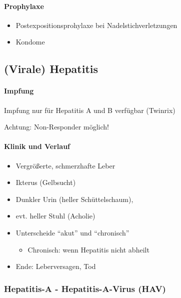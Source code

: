 \paragraph{Prophylaxe}

\begin{itemize}
    \item Postexpositionsprohylaxe bei Nadelstichverletzungen
    \item Kondome
\end{itemize}



\subsection{(Virale) Hepatitis} 


\paragraph{Impfung}Impfung nur f\"ur Hepatitis A und B
verf\"ugbar (Twinrix{\texttrademark})

Achtung: Non-Responder m\"oglich!

\paragraph{Klinik und Verlauf}

\begin{itemize}
    \item Vergr\"o{\ss}erte, schmerzhafte Leber
    \item Ikterus (Gelbsucht)
    \item Dunkler Urin (heller Sch\"uttelschaum),
    \item evt. heller Stuhl (Acholie)
    \item Unterscheide {\textquotedblleft}akut{\textquotedblright} und
    {\textquotedblleft}chronisch{\textquotedblright}
    \begin{itemize}
        \item Chronisch: wenn Hepatitis nicht abheilt
    \end{itemize}
    \item Ende: Leberversagen, Tod
\end{itemize}

\subsubsection{Hepatitis-A - Hepatitis-A-Virus (HAV)}

